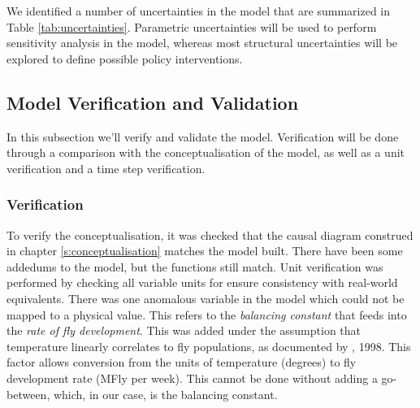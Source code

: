 We identified a number of uncertainties in the model that are summarized in Table \ref{tab:uncertainties}. Parametric uncertainties will be used to perform sensitivity analysis in the model, whereas most structural uncertainties will be explored to define possible policy interventions.



\subsection{Model Verification and Validation}
In this subsection we'll verify and validate the model. Verification will be done through a comparison with the conceptualisation of the model, as well as a unit verification and a time step verification. 

\subsubsection{Verification}
\label{s:verification}

    
To verify the conceptualisation, it was checked that the causal diagram construed in chapter \ref{s:conceptualisation} matches the model built. There have been some addedums to the model, but the functions still match.  
Unit verification was performed by checking all variable units for ensure consistency with real-world equivalents. There was one anomalous variable in the model which could not be mapped to a physical value. This refers to the \textit{balancing constant} that feeds into the \textit{rate of fly development}. This was added under the assumption that temperature linearly correlates to fly populations, as documented by \citeauthor{blanckenhorn_adaptive_1998}, 1998. This factor allows conversion from the units of temperature (degrees) to fly development rate (MFly per week). This cannot be done without adding a go-between, which, in our case, is the balancing constant. 

